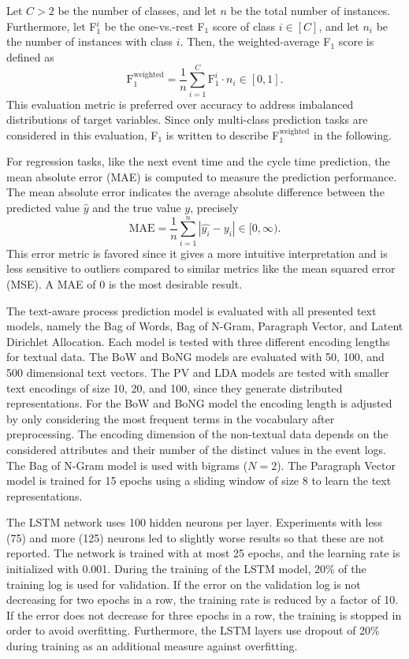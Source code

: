 Let $C>2$ be the number of classes, and let $n$ be the total number of instances.
Furthermore, let F$_1^i$ be the one-vs.-rest F$_1$ score of class $i \in [C]$, and let $n_i$ be the number of instances with class $i$.
Then, the weighted-average F$_1$ score is defined as
\begin{equation*}
	\textrm{F}_1^\mathrm{weighted} = \dfrac{1}{n} \sum_{i = 1}^{C} \mathrm{F}_1^i \cdot n_i \in [0,1].
\end{equation*}
This evaluation metric is preferred over accuracy to address imbalanced distributions of target variables.
Since only multi-class prediction tasks are considered in this evaluation, F$_1$ is written to describe F$_1^\mathrm{weighted}$ in the following.

For regression tasks, like the next event time and the cycle time prediction, the mean absolute error (MAE) is computed to measure the prediction performance. The mean absolute error indicates the average absolute difference between the predicted value $\hat{y}$ and the true value $y$,  precisely
\begin{equation*}
	\textrm{MAE} = \dfrac{1}{n}\sum_{i=1}^{n}|\hat{y_i} - y_i| \in [0, \infty).
\end{equation*}
This error metric is favored since it gives a more intuitive interpretation and is less sensitive to outliers compared to similar metrics like the mean squared error (MSE).
A MAE of 0 is the most desirable result.

The text-aware process prediction model is evaluated with all presented text models, namely the Bag of Words, Bag of N-Gram, Paragraph Vector, and Latent Dirichlet Allocation.
Each model is tested with three different encoding lengths for textual data.
The BoW and BoNG models are evaluated with 50, 100, and 500 dimensional text vectors.
The PV and LDA models are tested with smaller text encodings of size 10, 20, and 100, since they generate distributed representations.
For the BoW and BoNG model the encoding length is adjusted by only considering the most frequent terms in the vocabulary after preprocessing.
The encoding dimension of the non-textual data depends on the considered attributes and their number of the distinct values in the event logs.
The Bag of N-Gram model is used with bigrams ($N = 2$).
The Paragraph Vector model is trained for 15 epochs using a sliding window of size 8 to learn the text representations.

The LSTM network uses 100 hidden neurons per layer.
Experiments with less (75) and more (125) neurons led to slightly worse results so that these are not reported.
The network is trained with at most 25 epochs, and the learning rate is initialized with 0.001.
During the training of the LSTM model, 20\% of the training log is used for validation.
If the error on the validation log is not decreasing for two epochs in a row, the training rate is reduced by a factor of 10.
If the error does not decrease for three epochs in a row, the training is stopped in order to avoid overfitting.
Furthermore, the LSTM layers use dropout of 20\% during training as an additional measure against overfitting.


